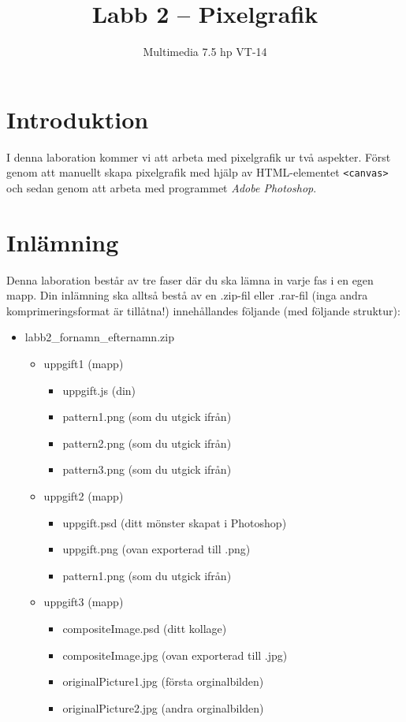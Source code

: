 \documentclass[12pt]{article}
\date{}
\title{ Labb 2 -- Pixelgrafik }
\author{ Multimedia 7.5 hp VT-14 }
\begin{document}
\maketitle
\vspace{-2em}



\section{Introduktion}
I denna laboration kommer vi att arbeta med pixelgrafik ur två aspekter. Först genom att manuellt skapa pixelgrafik med hjälp av HTML-elementet \texttt{<canvas>} och sedan genom att arbeta med programmet \emph{Adobe Photoshop}.

\section{Inlämning}
Denna laboration består av tre faser där du ska lämna in varje fas i en egen mapp. Din inlämning ska alltså bestå av en .zip-fil eller .rar-fil (inga andra komprimeringsformat är tillåtna!) innehållandes följande (med följande struktur):
  \begin{itemize}
    \item labb2\_fornamn\_efternamn.zip

      \begin{itemize}
        \item uppgift1 (mapp)
          \begin{itemize}
            \item uppgift.js (din)
            \item pattern1.png (som du utgick ifrån)
            \item pattern2.png (som du utgick ifrån)
            \item pattern3.png (som du utgick ifrån)
          \end{itemize}

        \item uppgift2 (mapp)
          \begin{itemize}
            \item uppgift.psd  (ditt mönster skapat i Photoshop)
            \item uppgift.png  (ovan exporterad till .png)
            \item pattern1.png (som du utgick ifrån)
          \end{itemize}

        \item uppgift3 (mapp)
          \begin{itemize}
	    \item compositeImage.psd (ditt kollage)
            \item compositeImage.jpg (ovan exporterad till .jpg)
            \item originalPicture1.jpg (första orginalbilden)
            \item originalPicture2.jpg (andra orginalbilden)
          \end{itemize}
    \end{itemize}
  \end{itemize}
\end{document}
